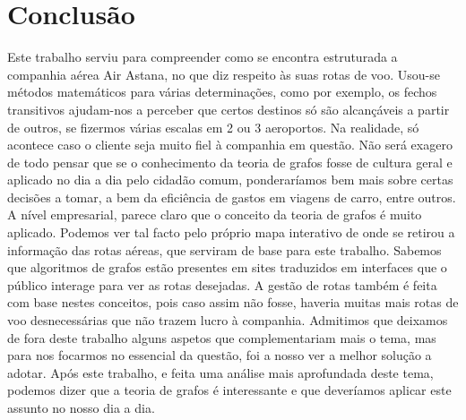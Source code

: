 \chapter{Conclusão}
Este trabalho serviu para compreender como se encontra estruturada a companhia aérea Air Astana, no 
que diz respeito às suas rotas de voo. Usou-se métodos matemáticos para várias determinações, como por 
exemplo, os fechos transitivos ajudam-nos a perceber que certos destinos só são alcançáveis a partir de outros, se 
fizermos várias escalas em 2 ou 3 aeroportos. Na realidade, só acontece caso o cliente seja muito fiel à companhia 
em questão.
Não será exagero de todo pensar que se o conhecimento da teoria de grafos fosse de cultura geral e 
aplicado no dia a dia pelo cidadão comum, ponderaríamos bem mais sobre certas decisões a tomar, a bem da 
eficiência de gastos em viagens de carro, entre outros.
A nível empresarial, parece claro que o conceito da teoria de grafos é muito aplicado. Podemos ver tal 
facto pelo próprio mapa interativo de onde se retirou a informação das rotas aéreas, que serviram de base para 
este trabalho. Sabemos que algoritmos de grafos estão presentes em sites traduzidos em interfaces que o público 
interage para ver as rotas desejadas. A gestão de rotas também é feita com base nestes conceitos, pois caso 
assim não fosse, haveria muitas mais rotas de voo desnecessárias que não trazem lucro à companhia.
Admitimos que deixamos de fora deste trabalho alguns aspetos que complementariam mais o tema, mas 
para nos focarmos no essencial da questão, foi a nosso ver a melhor solução a adotar.
Após este trabalho, e feita uma análise mais aprofundada deste tema, podemos dizer que a teoria de 
grafos é interessante e que deveríamos aplicar este assunto no nosso dia a dia.
